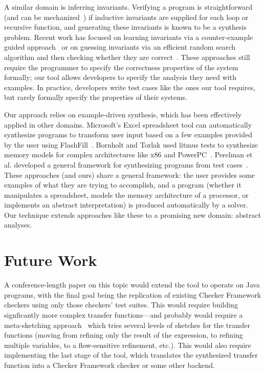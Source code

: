 \documentclass[10pt,conference]{IEEEtran}
\begin{document}
A similar domain is inferring invariants. Verifying a program is straightforward
(and can be mechanized~\cite{hoare69}) if inductive invariants are supplied for
each loop or recursive function, and generating these invariants is
known to be a synthesis problem. Recent work has focused on learning
invariants via a counter-example guided approach~\cite{garg2014ice} or
on guessing invariants via an efficient random search algorithm and then
checking whether they are correct~\cite{sharma2016invariant}.
These approaches still require the programmer to specify the correctness
properties of the system formally; our tool allows developers to specify
the analysis they need with examples. In practice, developers write
test cases like the ones our tool requires, but rarely formally specify
the properties of their systems.

Our approach relies on example-driven synthesis, which has been effectively
applied in other domains. Microsoft's Excel spreadsheet tool can automatically
synthesize programs to transform user input based on a few examples
provided by the user using FlashFill~\cite{flashfill}. Bornholt and
Torlak used litmus tests to synthesize memory models for complex architectures
like x86 and PowerPC~\cite{bornholt17}. Perelman et al. developed a general
framework for synthesizing programs from test cases~\cite{perelman2014test}.
These approaches (and ours) share a general framework: the user provides
some examples of what they are trying to accomplish, and a program
(whether it manipulates a spreadsheet, models the memory architecture of
a processor, or implements an abstract interpretation) is produced
automatically by a solver. Our technique extends approaches like these
to a promising new domain: abstract analyses.

\section{Future Work}
\label{sec-fw}

A conference-length paper on this topic would extend the tool to operate
on Java programs, with the final goal being the replication of
existing Checker Framework checkers using only those checkers'
test suites. This would require building signficantly more
complex transfer functions---and probably would require
a meta-sketching approach~\cite{metasketching} which tries several levels of
sketches for the transfer functions (moving from refining only the result of the expression, to
refining multiple variables, to a flow-sensitive refinement, etc.).
This would also require implementing the last stage of the tool, which
translates the synthesized transfer function into a Checker Framework
checker or some other backend.
\end{document}
